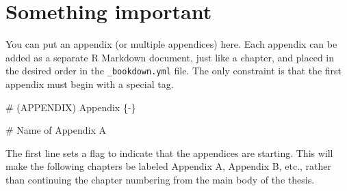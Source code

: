 \documentclass[12pt,english]{kuthesis}
\newenvironment{Shaded}{\begin{snugshade}}{\end{snugshade}}
\newcommand{\FunctionTok}[1]{\textcolor[rgb]{0.00,0.00,0.00}{#1}}
\begin{document}
\setlength{\parindent}{15pt}
\setlength{\leftskip}{0pt}

\hypertarget{appendix-appendix}{%
\appendix}


\hypertarget{something-important}{%
\chapter{Something important}\label{something-important}}

You can put an appendix (or multiple appendices) here. Each appendix can be added as a separate R Markdown document, just like a chapter, and placed in the desired order in the \texttt{\_bookdown.yml} file. The only constraint is that the first appendix must begin with a special tag.

\begin{Shaded}
\begin{Highlighting}[]
\FunctionTok{# (APPENDIX) Appendix \{-\}}

\FunctionTok{# Name of Appendix A}
\end{Highlighting}
\end{Shaded}

The first line sets a flag to indicate that the appendices are starting. This will make the following chapters be labeled Appendix A, Appendix B, etc., rather than continuing the chapter numbering from the main body of the thesis.
\end{document}
